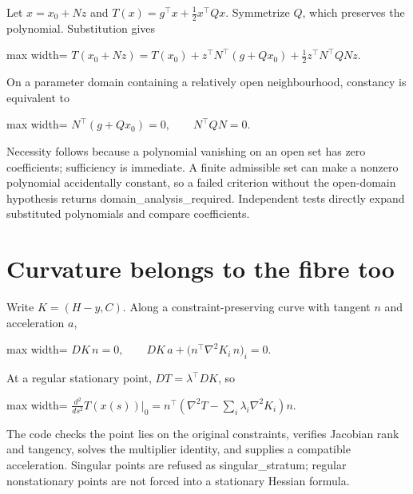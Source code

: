 \documentclass[
  11pt,
  a4paper,
]{report}
\begin{document}
Let \(x=x_0+Nz\) and \(T(x)=g^\top x+\frac12x^\top Qx\). Symmetrize
\(Q\), which preserves the polynomial. Substitution gives \begin{center}
\begin{adjustbox}{max width=\linewidth}
$\displaystyle
T(x_0+Nz)=T(x_0)+z^\top N^\top(g+Qx_0)+\tfrac12z^\top N^\top QNz.
$
\end{adjustbox}
\end{center} On a parameter domain containing a relatively open neighbourhood,
constancy is equivalent to \begin{center}
\begin{adjustbox}{max width=\linewidth}
$\displaystyle
N^\top(g+Qx_0)=0,\qquad N^\top QN=0.
$
\end{adjustbox}
\end{center} Necessity follows because a polynomial vanishing on an open set has
zero coefficients; sufficiency is immediate. A finite admissible set can
make a nonzero polynomial accidentally constant, so a failed criterion
without the open-domain hypothesis returns domain\_analysis\_required.
Independent tests directly expand substituted polynomials and compare
coefficients.

\hypertarget{curvature-belongs-to-the-fibre-too}{%
\section{Curvature belongs to the fibre
too}\label{curvature-belongs-to-the-fibre-too}}

Write \(K=(H-y,C)\). Along a constraint-preserving curve with tangent
\(n\) and acceleration \(a\), \begin{center}
\begin{adjustbox}{max width=\linewidth}
$\displaystyle
DK\,n=0,\qquad DK\,a+\big(n^\top\nabla^2K_i\,n\big)_i=0.
$
\end{adjustbox}
\end{center} At a regular stationary point, \(DT=\lambda^\top DK\), so \begin{center}
\begin{adjustbox}{max width=\linewidth}
$\displaystyle
\frac{d^2}{ds^2}T(x(s))\big|_0
=n^\top\left(\nabla^2T-\sum_i\lambda_i\nabla^2K_i\right)n.
$
\end{adjustbox}
\end{center} The code checks the point lies on the original constraints, verifies
Jacobian rank and tangency, solves the multiplier identity, and supplies
a compatible acceleration. Singular points are refused as
singular\_stratum; regular nonstationary points are not forced into a
stationary Hessian formula.
\end{document}
